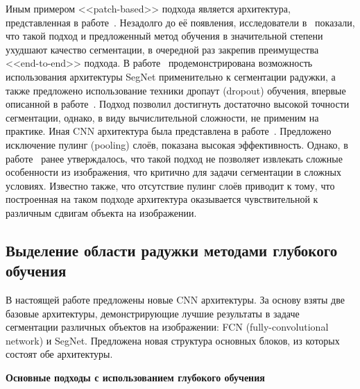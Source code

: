 Иным примером <<patch-based>> подхода является архитектура, представленная в работе~\cite{arsalan_2017}. Незадолго до её появления, исследователи в~\cite{shelhamer_2017} показали, что такой подход и предложенный метод обучения в значительной степени ухудшают качество сегментации, в очередной раз закрепив преимущества <<end-to-end>> подхода. В работе~\cite{jalilian_2017} продемонстрирована возможность использования архитектуры SegNet применительно к сегментации радужки, а также предложено использование техники дропаут (dropout) обучения, впервые описанной в работе~\cite{wang_2013}. Подход позволил достигнуть достаточно высокой точности сегментации, однако, в виду вычислительной сложности, не применим на практике. Иная CNN архитектура была представлена в работе~\cite{bazrafkan_2018}. Предложено исключение пулинг (pooling) слоёв, показана высокая эффективность. Однако, в работе~\cite{krizhevsky_2012} ранее утверждалось, что такой подход не позволяет извлекать сложные особенности из изображения, что критично для задачи сегментации в сложных условиях. Известно также, что отсутствие пулинг слоёв приводит к тому, что построенная на таком подходе архитектура оказывается чувствительной к различным сдвигам объекта на изображении.

\subsection{Выделение области радужки методами глубокого обучения}
\label{sec:segm_proposed_method}

В настоящей работе предложены новые CNN архитектуры. За основу взяты две базовые архитектуры, демонстрирующие лучшие результаты в задаче сегментации различных объектов на изображении: FCN (fully-convolutional network) и SegNet. Предложена новая структура основных блоков, из которых состоят обе архитектуры.

{\bf Основные подходы с использованием глубокого обучения}
\label{sec:segm_basic}

